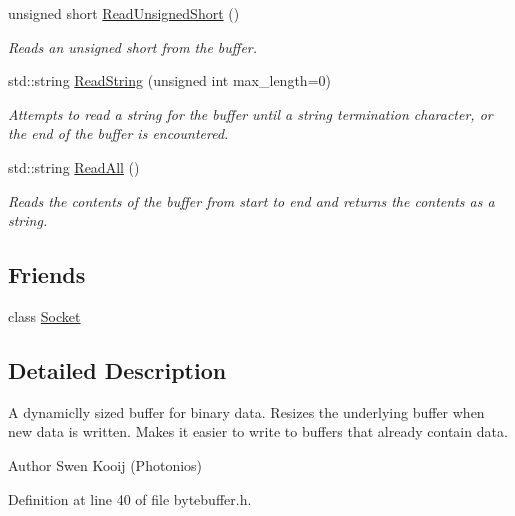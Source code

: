 \begin{DoxyCompactItemize}
unsigned short \hyperlink{class_senergy_1_1_byte_buffer_aa6b6bfdb398a75b92c79bcdfc1986821}{Read\-Unsigned\-Short} ()
\begin{DoxyCompactList}\small\item\em Reads an unsigned short from the buffer. \end{DoxyCompactList}\item 
std\-::string \hyperlink{class_senergy_1_1_byte_buffer_ab1f14bdb0b09b2144d1775fa2dff95a6}{Read\-String} (unsigned int max\-\_\-length=0)
\begin{DoxyCompactList}\small\item\em Attempts to read a string for the buffer until a string termination character, or the end of the buffer is encountered. \end{DoxyCompactList}\item 
std\-::string \hyperlink{class_senergy_1_1_byte_buffer_a5c3f960422533abc898061be11b6f613}{Read\-All} ()
\begin{DoxyCompactList}\small\item\em Reads the contents of the buffer from start to end and returns the contents as a string. \end{DoxyCompactList}\end{DoxyCompactItemize}
\subsection*{Friends}
\begin{DoxyCompactItemize}
\item 
class \hyperlink{class_senergy_1_1_byte_buffer_ab510887d735ee73ab1cb598c66260e87}{Socket}
\end{DoxyCompactItemize}


\subsection{Detailed Description}
A dynamiclly sized buffer for binary data. Resizes the underlying buffer when new data is written. Makes it easier to write to buffers that already contain data. 

\begin{DoxyAuthor}{Author}
Swen Kooij (Photonios) 
\end{DoxyAuthor}


Definition at line 40 of file bytebuffer.\-h.



